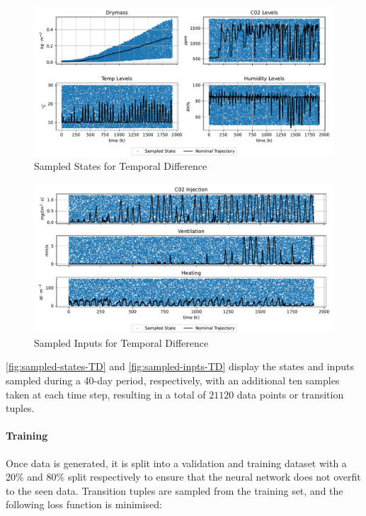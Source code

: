 \begin{figure}[H]
	\centering
	\includegraphics[width = \textwidth]{figures/sampled_y_td.png}
	\caption{Sampled States for Temporal Difference}
	\label{fig:sampled-states-TD}
\end{figure}
\begin{figure}[H]
	\centering
	\includegraphics[width = \textwidth]{figures/sampled_u_td.png}
	\caption{Sampled Inputs for Temporal Difference}
	\label{fig:sampled-inpts-TD}
\end{figure}

\autoref{fig:sampled-states-TD} and \autoref{fig:sampled-inpts-TD} display the states and inputs sampled during a 40-day period, respectively, with an additional ten samples taken at each time step, resulting in a total of $21120$ data points or transition tuples.



\paragraph{Training}
Once data is generated, it is split into a validation and training dataset with a 20\% and 80\% split respectively to ensure that the neural network does not overfit to the seen data. Transition tuples are sampled from the training set, and the following loss function is minimised:


